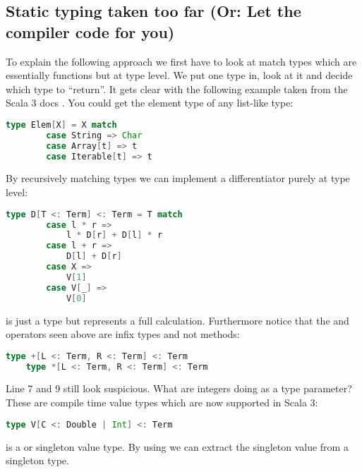 \subsection{Static typing taken too far (Or: Let the compiler code for you)}
To explain the following approach we first have to look at match types which are essentially functions but at type level. We put one type in, look at it and decide which type to ``return''. It gets clear with the following example taken from the Scala 3 docs \cite{matchTypesScala3}. You could get the element type of any list-like type:
\begin{lstlisting}[language=scala]
    type Elem[X] = X match
        case String => Char
        case Array[t] => t
        case Iterable[t] => t
\end{lstlisting}
By recursively matching types we can implement a differentiator purely at type level:
\begin{lstlisting}[language=scala]
    type D[T <: Term] <: Term = T match
        case l * r => 
            l * D[r] + D[l] * r
        case l + r => 
            D[l] + D[r]
        case X => 
            V[1]
        case V[_] => 
            V[0]
\end{lstlisting}
 is just a type but represents a full calculation. Furthermore notice that the \lstscalainline{*} and \lstscalainline{+} operators seen above are infix types and not methods:
\begin{lstlisting}[language=scala]
    type +[L <: Term, R <: Term] <: Term
    type *[L <: Term, R <: Term] <: Term
\end{lstlisting}
Line 7 and 9 still look suspicious. What are integers doing as a type parameter? These are compile time value types which are now supported in Scala 3:
\begin{lstlisting}[language=scala]
    type V[C <: Double | Int] <: Term
\end{lstlisting}
 is a  or  singleton value type. By using  we can extract the singleton value from a singleton type.

